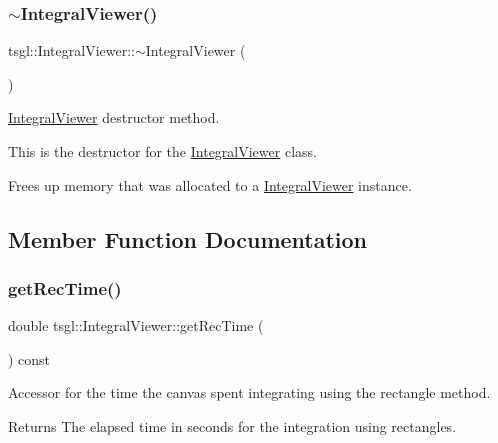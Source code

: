 \subsubsection{\texorpdfstring{$\sim$\+Integral\+Viewer()}{~IntegralViewer()}}
{\footnotesize\ttfamily tsgl\+::\+Integral\+Viewer\+::$\sim$\+Integral\+Viewer (\begin{DoxyParamCaption}{ }\end{DoxyParamCaption})}



\hyperlink{classtsgl_1_1_integral_viewer}{Integral\+Viewer} destructor method. 

This is the destructor for the \hyperlink{classtsgl_1_1_integral_viewer}{Integral\+Viewer} class.

Frees up memory that was allocated to a \hyperlink{classtsgl_1_1_integral_viewer}{Integral\+Viewer} instance. 

\subsection{Member Function Documentation}
\mbox{\label{classtsgl_1_1_integral_viewer_a4a65831c2fbda3d9382a07a5aa154447}} 
\subsubsection{\texorpdfstring{get\+Rec\+Time()}{getRecTime()}}
{\footnotesize\ttfamily double tsgl\+::\+Integral\+Viewer\+::get\+Rec\+Time (\begin{DoxyParamCaption}{ }\end{DoxyParamCaption}) const\hspace{0.3cm}{\ttfamily [inline]}}



Accessor for the time the canvas spent integrating using the rectangle method. 

\begin{DoxyReturn}{Returns}
The elapsed time in seconds for the integration using rectangles. 
\end{DoxyReturn}
\mbox{\label{classtsgl_1_1_integral_viewer_a9125196e3b1119d87c86d9f0062d4c38}} 
